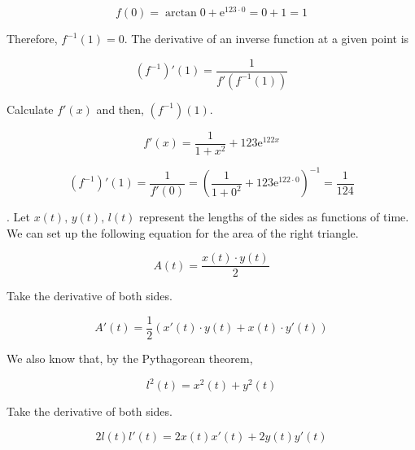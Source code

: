 \documentclass{article}
\begin{document}
\begin{equation*}f(0) = \arctan 0 + \mathrm{e}^{123\cdot 0} = 0 + 1 = 1\end{equation*}

\hfill

\hfill

\noindent Therefore, $f^{-1}(1)=0$. The derivative of an inverse function at a given point is

\begin{equation*}
\left(f^{-1}\right)'(1) = \frac1{f'(f^{-1}(1))}
\end{equation*}

\hfill

\noindent Calculate $f'(x)$ and then, $(f^{-1})(1)$.

\begin{equation*}
    f'(x)=\frac1{1+x^2}+123\mathrm{e}^{122x}
\end{equation*}

\begin{equation*}
    \left(f^{-1}\right)'(1)=\frac{1}{f'(0)}=\left( \frac1{1+0^2}+123\mathrm{e}^{122\cdot0} \right)^{-1}=\boxed{\frac1{124}}
\end{equation*}

\hfill

. Let $x(t),\,y(t),\,l(t)$ represent the lengths of the sides as functions of time. We can set up the following equation for the area of the right triangle.

\begin{equation*}A(t) = \frac{x(t)\cdot y(t)}{2}\end{equation*}

\hfill

\noindent Take the derivative of both sides.

\begin{equation}A'(t) =\frac12\left(x'(t)\cdot y(t) + x(t)\cdot y'(t) \right)\end{equation}

\hfill

\noindent We also know that, by the Pythagorean theorem,

\begin{equation*}l^2(t) = x^2(t)+y^2(t)\end{equation*}

\hfill

\noindent Take the derivative of both sides.

\begin{equation*}2l(t)l'(t)= 2x(t)x'(t)+2y(t)y'(t)\end{equation*}
\end{document}
